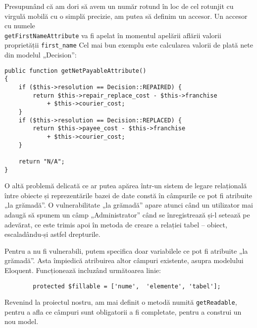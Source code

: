 	Presupunând că am dori să avem un număr rotund în loc de cel rotunjit cu virgulă mobilă cu o simplă precizie, am putea să definim un accesor.
	Un accesor cu numele\\ \verb|getFirstNameAttribute| va fi apelat în momentul apelării aflării valorii proprietății \verb|first_name|
	Cel mai bun exemplu este calcularea valorii de plată nete din modelul „Decision”:
\begin{Verbatim}
public function getNetPayableAttribute()
{
    if ($this->resolution == Decision::REPAIRED) {
        return $this->repair_replace_cost - $this->franchise
            + $this->courier_cost;
    }
    if ($this->resolution == Decision::REPLACED) {
        return $this->payee_cost - $this->franchise
            + $this->courier_cost;
    }

    return "N/A";
}
\end{Verbatim}

	O altă problemă delicată ce ar putea apărea într-un sistem de legare relațională între obiecte și reprezentările bazei de date constă în câmpurile ce pot fi atribuite „la grămadă”.
	O vulnerabilitate „la grămadă” apare atunci când un utilizator mai adaugă să spunem un câmp „Administrator” când se înregistrează și-l setează pe adevărat, ce este trimis apoi în metoda de creare a relației tabel -- obiect, escaladându-și astfel drepturile.

	Pentru a nu fi vulnerabili, putem specifica doar variabilele ce pot fi atribuite „la grămadă”.
	Asta împiedică atribuirea altor câmpuri existente, asupra modelului Eloquent.
	Funcționează incluzând următoarea linie:
	\begin{verbatim}
		protected $fillable = ['nume',  'elemente', 'tabel'];
	\end{verbatim}

	Revenind la proiectul nostru, am mai definit o metodă numită \verb|getReadable|, pentru a afla ce câmpuri sunt obligatorii a fi completate, pentru a construi un nou model.


